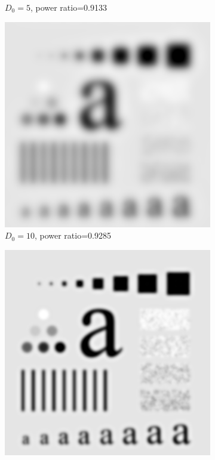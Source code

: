 \begin{figure}[h!]
\begin{subfigure}[b]{0.45\linewidth}
		\caption{$D_0=5$, power ratio=0.9133}
		\label{fig:BLPF_5}
	\end{subfigure}
	\begin{subfigure}[b]{0.45\linewidth}
		\includegraphics[width=\linewidth]{myfigure/p3/BLPF_10.png}
		\caption{$D_0=10$, power ratio=0.9285}
		\label{fig:BLPF_10}
	\end{subfigure}
	\begin{subfigure}[b]{0.45\linewidth}
		\includegraphics[width=\linewidth]{myfigure/p3/BLPF_30.png}

\end{subfigure}
\end{figure}

